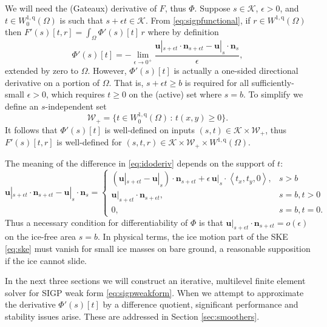 \documentclass[letterpaper,final,12pt,reqno]{amsart}
\theoremstyle{claim}
\newcommand{\eps}{\epsilon}
\newcommand{\bn}{\mathbf{n}}
\newcommand{\bu}{\mathbf{u}}
\newcommand{\qq}{{\text{q}}}
\newcommand{\bus}{\bu|_s}
\numberwithin{equation}{section}
\numberwithin{figure}{section}
\numberwithin{table}{section}
\numberwithin{theorem}{section}
\begin{document}
We will need the (Gateaux) derivative of $F$, thus $\Phi$.  Suppose $s\in \mathcal{K}$, $\eps>0$, and $t \in W_0^{1,\qq}(\Omega)$ is such that $s+\eps t \in \mathcal{K}$.  From \eqref{eq:sigpfunctional}, if $r\in W^{1,\qq}(\Omega)$ then $F'(s)[t,r] = \int_\Omega \Phi'(s)[t]\, r$ where by definition
\begin{equation}
\Phi'(s)[t] = - \lim_{\eps\to 0^+} \frac{\bu|_{s+\eps t} \cdot \bn_{s+\eps t} - \bus \cdot \bn_s}{\eps}, \label{eq:idoderiv}
\end{equation}
extended by zero to $\Omega$.  However, $\Phi'(s)[t]$ is actually a one-sided directional derivative on a portion of $\Omega$.  That is, $s+\eps t\ge b$ is required for all sufficiently-small $\eps>0$, which requires $t\ge 0$ on the (active) set where $s=b$.  To simplify we define an $s$-independent set
\begin{equation}
\mathcal{W}_+ = \{t \in W_0^{1,\qq}(\Omega) \,:\, t(x,y) \ge 0\}. \label{eq:infdefectset}
\end{equation}
It follows that $\Phi'(s)[t]$ is well-defined on inputs $(s,t) \in \mathcal{K} \times \mathcal{W}_+$, thus $F'(s)[t,r]$ is well-defined for $(s,t,r) \in \mathcal{K} \times \mathcal{W}_+ \times W^{1,\qq}(\Omega)$.

The meaning of the difference in \eqref{eq:idoderiv} depends on the support of $t$:
\begin{equation}
\bu|_{s+\eps t} \cdot \bn_{s+\eps t} - \bus \cdot \bn_s = \begin{cases}
           (\bu|_{s+\eps t} - \bus) \cdot \bn_{s+\eps t} + \eps\, \bus \cdot \left<t_x,t_y,0\right>, & s > b \\
           \bu|_{s+\eps t} \cdot \bn_{s+\eps t}, & s=b, t > 0 \\
           0, & s=b, t = 0.
                 \end{cases} \label{eq:differencecases}
\end{equation}
Thus a necessary condition for differentiability of $\Phi$ is that $\bu|_{s+\eps t} \cdot \bn_{s+\eps t} = o(\eps)$ on the ice-free area $s=b$.  In physical terms, the ice motion part of the SKE \eqref{eq:ske} must vanish for small ice masses on bare ground, a reasonable supposition if the ice cannot slide.

In the next three sections we will construct an iterative, multilevel finite element solver for SIGP weak form \eqref{eq:sigpweakform}.  When we attempt to approximate the derivative $\Phi'(s)[t]$ by a difference quotient, significant performance and stability issues arise.  These are addressed in Section \ref{sec:smoothers}.
\end{document}
